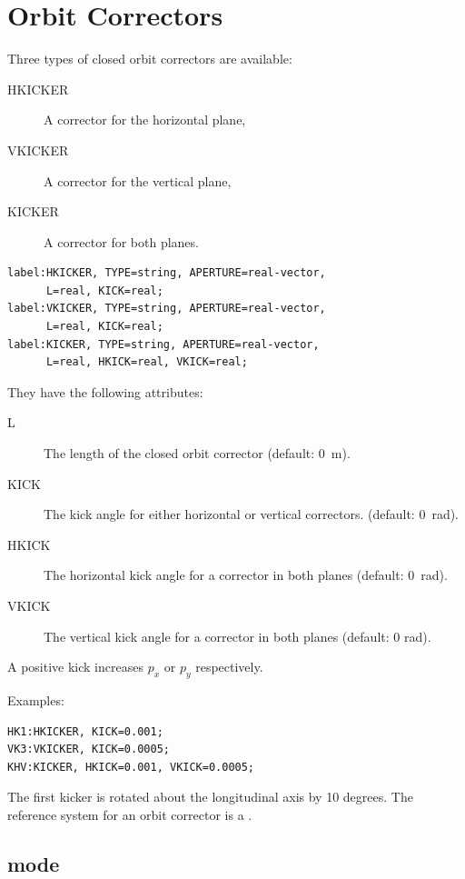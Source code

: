 \section{Orbit Correctors}
\label{sec:corrector}
Three types of closed orbit correctors are available:
\begin{description}
\item[HKICKER]
  \label{sec:hkicker}
  A corrector for the horizontal plane,
\item[VKICKER]
  \label{sec:vkicker}
  A corrector for the vertical plane,
\item[KICKER]
  \label{sec:kicker}
  A corrector for both planes.
\end{description}
\begin{verbatim}
label:HKICKER, TYPE=string, APERTURE=real-vector,
      L=real, KICK=real;
label:VKICKER, TYPE=string, APERTURE=real-vector,
      L=real, KICK=real;
label:KICKER, TYPE=string, APERTURE=real-vector,
      L=real, HKICK=real, VKICK=real;
\end{verbatim}
They have the following attributes:
\begin{description}
\item[L]
  The length of the closed orbit corrector (default: 0~m).
\item[KICK]
  The kick angle for either horizontal or vertical correctors.
  (default: 0~rad).
\item[HKICK]
  The horizontal kick angle for a corrector in both planes
  (default: 0~rad).
\item[VKICK]
  The vertical kick angle for a corrector in both planes
  (default: 0 rad).
\end{description}
A positive kick increases $p_{x}$ or $p_{y}$
respectively.

\noindent Examples:
\begin{verbatim}
HK1:HKICKER, KICK=0.001;
VK3:VKICKER, KICK=0.0005;
KHV:KICKER, HKICK=0.001, VKICK=0.0005;
\end{verbatim}
The first kicker is rotated about the longitudinal axis by 10 degrees.
The reference system for an orbit corrector is a 
.

\subsection{\opalt mode}

